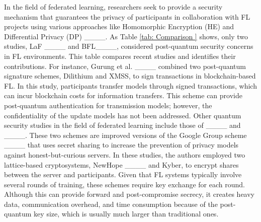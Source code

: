  In the field of federated learning, researchers seek to provide a security mechanism that guarantees the privacy of participants in collaboration with FL projects using various approaches like Homomorphic Encryption (HE) and Differential Privacy (DP) ____. 
 As Table \ref{tab: Comparison } shows, only two studies, LaF ____ and BFL____, considered post-quantum security concerns in FL environments.  
 This table compares recent studies and identifies their contributions. 
 For instance, Gurung et al. ____ combined two post-quantum signature schemes, Dilithium and XMSS, to sign transactions in blockchain-based FL.  
 In this study, participants transfer models through signed transactions, which can incur blockchain costs for information transfers.  
 This scheme can provide post-quantum authentication for transmission models; however, the confidentiality of the update models has not been addressed.   Other quantum security studies in the field of federated learning include those of ____ and ____.   
 These two schemes are improved versions of the Google Group scheme ____ that uses secret sharing to increase the prevention of privacy models against honest-but-curious servers. 
 In these studies, the authors employed two lattice-based cryptosystems, NewHope ____ and Kyber, to encrypt shares between the server and participants. 
 Given that FL systems typically involve several rounds of training, these schemes require key exchange for each round.   
 Although this can provide forward and post-compromise secrecy, it creates heavy data, communication overhead, and time consumption because of the post-quantum key size, which is usually much larger than traditional ones.

